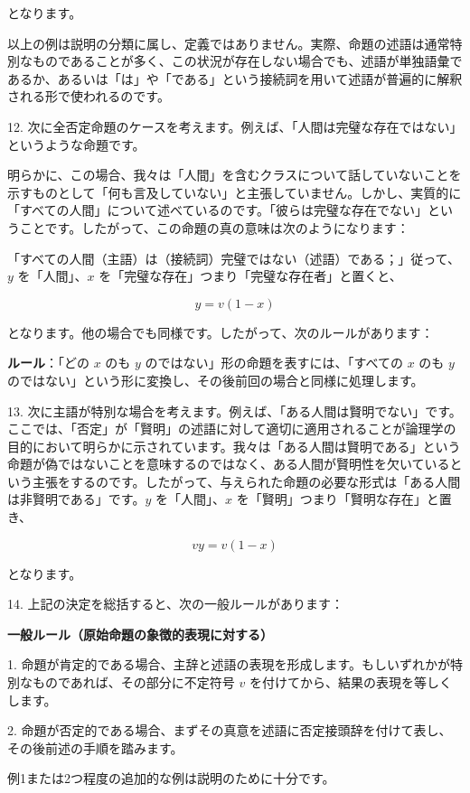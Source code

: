 \documentclass[a4paper,11pt,openany]{ltjsbook}
\begin{document}
となります。

以上の例は説明の分類に属し、定義ではありません。実際、命題の述語は通常特別なものであることが多く、この状況が存在しない場合でも、述語が単独語彙であるか、あるいは「は」や「である」という接続詞を用いて述語が普遍的に解釈される形で使われるのです。

12. 次に全否定命題のケースを考えます。例えば、「人間は完璧な存在ではない」というような命題です。

明らかに、この場合、我々は「人間」を含むクラスについて話していないことを示すものとして「何も言及していない」と主張していません。しかし、実質的に「すべての人間」について述べているのです。「彼らは完璧な存在でない」ということです。したがって、この命題の真の意味は次のようになります：

「すべての人間（主語）は（接続詞）完璧ではない（述語）である；」従って、$y$ を「人間」、$x$ を「完璧な存在」つまり「完璧な存在者」と置くと、

\[
y = v \left( 1 - x \right)
\]

となります。他の場合でも同様です。したがって、次のルールがあります：

\textbf{ルール}：「どの $x$ のも $y$ のではない」形の命題を表すには、「すべての $x$ のも $y$ のではない」という形に変換し、その後前回の場合と同様に処理します。

13. 次に主語が特別な場合を考えます。例えば、「ある人間は賢明でない」です。ここでは、「否定」が「賢明」の述語に対して適切に適用されることが論理学の目的において明らかに示されています。我々は「ある人間は賢明である」という命題が偽ではないことを意味するのではなく、ある人間が賢明性を欠いているという主張をするのです。したがって、与えられた命題の必要な形式は「ある人間は非賢明である」です。$y$ を「人間」、$x$ を「賢明」つまり「賢明な存在」と置き、

\[
v y = v \left( 1 - x \right)
\]

となります。

14. 上記の決定を総括すると、次の一般ルールがあります：

\textbf{一般ルール（原始命題の象徴的表現に対する）}

1. 命題が肯定的である場合、主辞と述語の表現を形成します。もしいずれかが特別なものであれば、その部分に不定符号 \(v\) を付けてから、結果の表現を等しくします。

2. 命題が否定的である場合、まずその真意を述語に否定接頭辞を付けて表し、その後前述の手順を踏みます。

例1または2つ程度の追加的な例は説明のために十分です。
\end{document}

